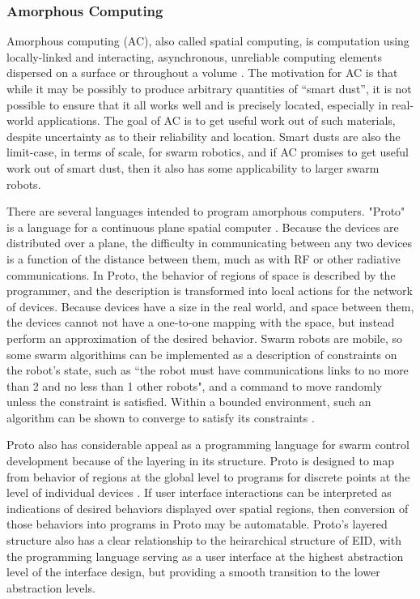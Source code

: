 \documentclass[]{article}
\begin{document}
\subsubsection{Amorphous Computing}

Amorphous computing (AC), also called spatial computing, is computation using locally-linked and interacting, asynchronous, unreliable computing elements dispersed on a surface or throughout a volume \cite{abelson2000amorphous}. 
The motivation for AC is that while it may be possibly to produce arbitrary quantities of ``smart dust'', it is not possible to ensure that it all works well and is precisely located, especially in real-world applications.
The goal of AC is to get useful work out of such materials, despite uncertainty as to their reliability and location. 
Smart dusts are also the limit-case, in terms of scale, for swarm robotics, and if AC promises to get useful work out of smart dust, then it also has some applicability to larger swarm robots.

There are several languages intended to program amorphous computers. 
"Proto" is a language for a continuous plane spatial computer \cite{correll2009ad}.
Because the devices are distributed over a plane, the difficulty in communicating between any two devices is a function of the distance between them, much as with RF or other radiative communications.
In Proto, the behavior of regions of space is described by the programmer, and the description is transformed into local actions for the network of devices. 
Because devices have a size in the real world, and space between them, the devices cannot not have a one-to-one mapping with the space, but instead perform an approximation of the desired behavior. 
Swarm robots are mobile, so some swarm algorithims can be implemented as a description of constraints on the robot's state, such as ``the robot must have communications links to no more than 2 and no less than 1 other robots", and a command to move randomly unless the constraint is satisfied. 
Within a bounded environment, such an algorithm can be shown to converge to satisfy its constraints \cite{correll2009ad}. 

Proto also has considerable appeal as a programming language for swarm control development because of the layering in its structure. 
Proto is designed to map from behavior of regions at the global level to programs for discrete points at the level of individual devices \cite{beal2006infrastructure}. 
If user interface interactions can be interpreted as indications of desired behaviors displayed over spatial regions, then conversion of those behaviors into programs in Proto may be automatable. 
Proto's layered structure also has a clear relationship to the heirarchical structure of EID, with the programming language serving as a user interface at the highest abstraction level of the interface design, but providing a smooth transition to the lower abstraction levels.  
\end{document}
